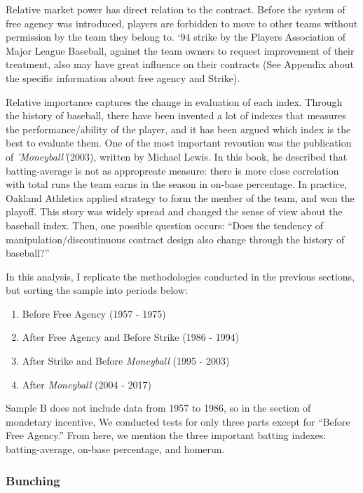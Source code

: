 \documentclass[dvipdfmx, 12pt]{article}
\begin{document}
Relative market power has direct relation to the contract. Before the system of free agency was introduced, players are forbidden to move to other teams without permission by the team they belong to. `94 strike by the Players Association of Major League Baseball, against the team owners to request improvement of their treatment, also may have great influence on their contracts (See Appendix about the specific information about free agency and Strike).

Relative importance captures the change in evaluation of each index. Through the history of baseball, there have been invented a lot of indexes that measures the performance/ability of the player, and it has been argued which index is the best to evaluate them. One of the most important revoution was the publication of \textit{'Moneyball'}(2003), written by Michael Lewis. In this book, he described that batting-average is not as appropreate measure: there is more close correlation with total runs the team earns in the season in on-base percentage. In practice, Oakland Athletics applied strategy to form the menber of the team, and won the playoff. This story was widely spread and changed the sense of view about the baseball index. Then, one possible question occurs: ``Does the tendency of manipulation/discoutinuous contract design also change through the history of baseball?''

In this analysis, I replicate the methodologies conducted in the previous sections, but sorting the sample into periods below:

\begin{enumerate}
  \item Before Free Agency (1957 - 1975)

  \item After Free Agency and Before Strike (1986 - 1994)

  \item After Strike and Before \textit{Moneyball} (1995 - 2003)

  \item After \textit{Moneyball} (2004 - 2017)
\end{enumerate}

Sample B does not include data from 1957 to 1986, so in the section of mondetary incentive, We conducted tests for only three parts except for ``Before Free Agency.'' From here, we mention the three important batting indexes: batting-average, on-base percentage, and homerun.

\subsubsection{Bunching}
\end{document}
